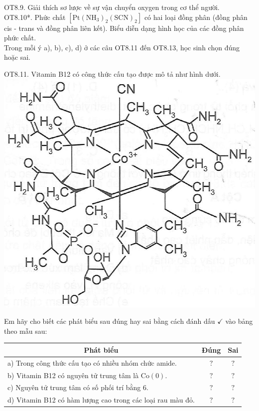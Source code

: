 \documentclass[10pt]{article}
\begin{document}
OT8.9. Giải thích sơ lược về sự vận chuyển oxygen trong cơ thể người.\\
OT8.10*. Phức chất $\left[\mathrm{Pt}\left(\mathrm{NH}_{3}\right)_{2}(\mathrm{SCN})_{2}\right]$ có hai loại đồng phân (đồng phân cis - trans và đồng phân liên kết). Biểu diễn dạng hình học của các đồng phân phức chất.\\
Trong mỗi ý a), b), c), d) ở các câu OT8.11 đến OT8.13, học sinh chọn đúng hoặc sai.

OT8.11. Vitamin B12 có công thức cấu tạo được mô tả như hình dưới.\\
\includegraphics[max width=\textwidth, center]{2025_10_23_de6f5713836e4e91b3c8g-132}

Em hãy cho biết các phát biểu sau đúng hay sai bằng cách đánh dấu $\checkmark$ vào bảng theo mẫu sau:

\begin{center}
\begin{tabular}{|l|c|c|}
\hline
\multicolumn{1}{|c|}{Phát biểu} & Đúng & Sai \\
\hline
a) Trong công thức cấu tạo có nhiều nhóm chức amide. & $?$ & $?$ \\
\hline
b) Vitamin B12 có nguyên tử trung tâm là $\mathrm{Co}(0)$. & $?$ & $?$ \\
\hline
c) Nguyên tử trung tâm có số phối trí bằng 6. & $?$ & $?$ \\
\hline
d) Vitamin B12 có hàm lượng cao trong các loại rau màu đỏ. & $?$ & $?$ \\
\hline
\end{tabular}
\end{center}
\end{document}
